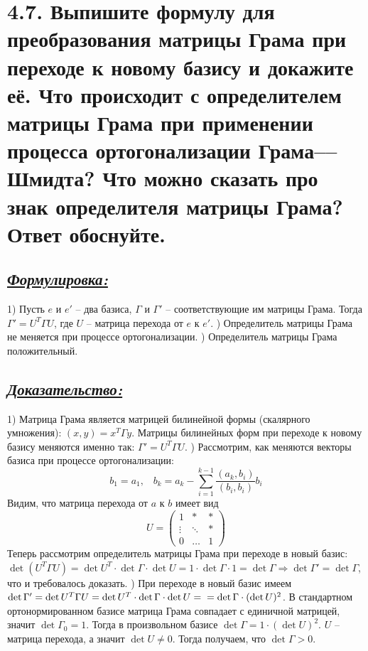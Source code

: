 \documentclass{article}
\begin{document}
\section*{\LARGE 4.7. Выпишите формулу для преобразования матрицы Грама при переходе к новому базису и докажите её. Что происходит с определителем матрицы Грама при применении процесса ортогонализации Грама––Шмидта? Что можно сказать про знак определителя матрицы Грама? Ответ обоснуйте.  }
\subsection*{\Large \underline{\textit{Формулировка: }}}
1) Пусть $e$ и $e'$ -- два базиса, $\Gamma$ и $\Gamma'$ -- соответствующие им матрицы Грама. Тогда $\Gamma' = U^T \Gamma U$, где $U$ -- матрица перехода от $e$ к $e'$.
) Определитель матрицы Грама не меняется при процессе ортогонализации. 
) Определитель матрицы Грама положительный.

\subsection*{\Large \underline{\textit{Доказательство: }}}
1) Матрица Грама является матрицей билинейной формы (скалярного умножения): $(x, y) = x^T \Gamma y$. Матрицы билинейных форм при переходе к новому базису меняются именно так: $\Gamma' = U^T \Gamma U$.
) Рассмотрим, как меняются векторы базиса при процессе ортогонализации:
$$
b_1 = a_1, \;\;\; b_k = a_k - \sum_{i = 1}^{k-1} \frac{(a_k, b_i)}{(b_i, b_i)}b_i
$$
Видим, что матрица перехода от $a$ к $b$ имеет вид
$$
U = 
\begin{pmatrix}
1 & \ast & \ast \\
\vdots & \ddots & \ast \\
0 & \dots & 1
\end{pmatrix}
$$
Теперь рассмотрим определитель матрицы Грама при переходе в новый базис: $\det(U^T \Gamma U) = \det{U^T}\cdot \det{\Gamma} \cdot \det{U} = 1 \cdot \det{\Gamma} \cdot 1 = \det{\Gamma} \Rightarrow \det{\Gamma'} = \det{\Gamma}$, что и требовалось доказать.
) При переходе в новый базис имеем $\det{\Gamma'} = \det{U^T \Gamma U} = \det{U^T} \cdot \det{\Gamma} \cdot \det{U} = \newline = \det{\Gamma}\cdot(\det{U})^2$. В стандартном ортонормированном базисе матрица Грама совпадает с единичной матрицей, значит $\det{\Gamma_0} = 1$. Тогда в произвольном базисе $\det{\Gamma} = 1 \cdot (\det{U})^2$. $U$ -- матрица перехода, а значит $\det{U} \ne 0$. Тогда получаем, что $\det{\Gamma} > 0$.
\end{document}
